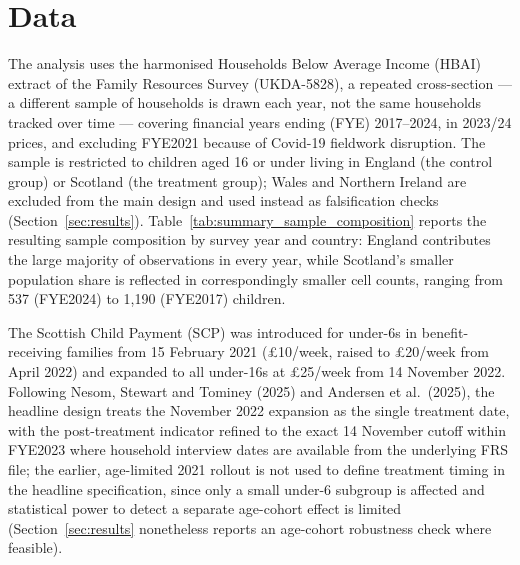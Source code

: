 \section{Data}
\label{sec:data}

The analysis uses the harmonised Households Below Average Income (HBAI) extract of the Family Resources Survey (UKDA-5828), a repeated cross-section --- a different sample of households is drawn each year, not the same households tracked over time --- covering financial years ending (FYE) 2017--2024, in 2023/24 prices, and excluding FYE2021 because of Covid-19 fieldwork disruption. The sample is restricted to children aged 16 or under living in England (the control group) or Scotland (the treatment group); Wales and Northern Ireland are excluded from the main design and used instead as falsification checks (Section~\ref{sec:results}). Table~\ref{tab:summary_sample_composition} reports the resulting sample composition by survey year and country: England contributes the large majority of observations in every year, while Scotland's smaller population share is reflected in correspondingly smaller cell counts, ranging from 537 (FYE2024) to 1,190 (FYE2017) children.



The Scottish Child Payment (SCP) was introduced for under-6s in benefit-receiving families from 15 February 2021 (\pounds10/week, raised to \pounds20/week from April 2022) and expanded to all under-16s at \pounds25/week from 14 November 2022. Following Nesom, Stewart and Tominey (2025) and Andersen et al.\ (2025), the headline design treats the November 2022 expansion as the single treatment date, with the post-treatment indicator refined to the exact 14 November cutoff within FYE2023 where household interview dates are available from the underlying FRS file; the earlier, age-limited 2021 rollout is not used to define treatment timing in the headline specification, since only a small under-6 subgroup is affected and statistical power to detect a separate age-cohort effect is limited (Section~\ref{sec:results} nonetheless reports an age-cohort robustness check where feasible).

